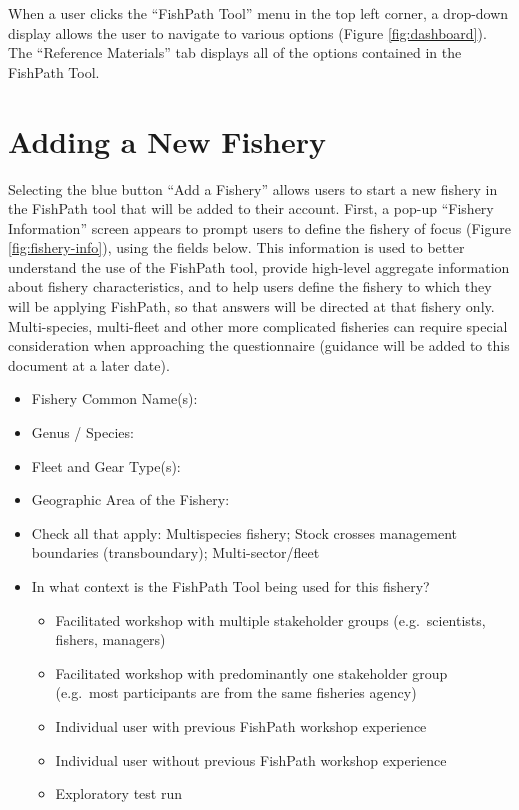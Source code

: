 \documentclass[11pt,]{book}
\providecommand{\tightlist}{%
  \setlength{\itemsep}{0pt}\setlength{\parskip}{0pt}}
\begin{document}
When a user clicks the ``FishPath Tool'' menu in the top left corner, a drop-down display allows the user to navigate to various options (Figure \ref{fig:dashboard}). The ``Reference Materials'' tab displays all of the options contained in the FishPath Tool.

\hypertarget{adding-a-new-fishery}{%
\section{Adding a New Fishery}\label{adding-a-new-fishery}}

Selecting the blue button ``Add a Fishery'' allows users to start a new fishery in the FishPath tool that will be added to their account. First, a pop-up ``Fishery Information'' screen appears to prompt users to define the fishery of focus (Figure \ref{fig:fishery-info}), using the fields below. This information is used to better understand the use of the FishPath tool, provide high-level aggregate information about fishery characteristics, and to help users define the fishery to which they will be applying FishPath, so that answers will be directed at that fishery only. Multi-species, multi-fleet and other more complicated fisheries can require special consideration when approaching the questionnaire (guidance will be added to this document at a later date).

\begin{itemize}
\tightlist
\item
  Fishery Common Name(s):
\item
  Genus / Species:
\item
  Fleet and Gear Type(s):
\item
  Geographic Area of the Fishery:
\item
  Check all that apply: Multispecies fishery; Stock crosses management boundaries (transboundary); Multi-sector/fleet
\item
  In what context is the FishPath Tool being used for this fishery?

  \begin{itemize}
  \tightlist
  \item
    Facilitated workshop with multiple stakeholder groups (e.g.~scientists, fishers, managers)
  \item
    Facilitated workshop with predominantly one stakeholder group (e.g.~most participants are from the same fisheries agency)
  \item
    Individual user with previous FishPath workshop experience
  \item
    Individual user without previous FishPath workshop experience
  \item
    Exploratory test run
  \end{itemize}
\end{itemize}
\end{document}

